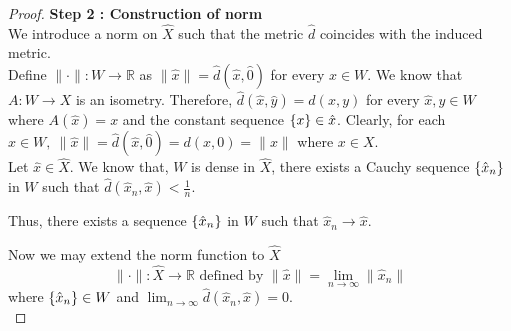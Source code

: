 \begin{proof}
	\textbf{Step 2 : Construction of norm}\\

	We introduce a norm on $\hat{X}$ such that the metric $\hat{d}$ coincides with the induced metric.\\
	
	Define $\| \cdot \| : W \to \mathbb{R}$ as $\| \hat{x} \| = \hat{d}(\hat{x},\hat{0})$ for every $\hat{x} \in W$.
	We know that $A : W \to X$ is an isometry.
	Therefore, $\hat{d}(\hat{x},\hat{y}) = d(x,y)$ for every $\hat{x},\hat{y} \in W$ where $A(\hat{x}) = x$ and the constant sequence $\left\{x\right\} \in \hat{x}$.
	Clearly, for each $\hat{x} \in W,\ \| \hat{x} \| = \hat{d}(\hat{x},\hat{0}) = d(x,0) = \| x \|$ where $x \in X$.\\

	Let $\hat{x} \in \hat{X}$. 
	We know that, $W$ is dense in $\hat{X}$, there exists a Cauchy sequence $\left\{\hat{x}_n\right\}$ in $W$ such that $\hat{d}(\hat{x}_n,\hat{x}) < \frac{1}{n}$.
	\begin{commentary}
	Thus, there exists a sequence $\left\{\hat{x}_n\right\}$ in $W$ such that $\hat{x}_n \to \hat{x}$.
	\end{commentary}
	Now we may extend the norm function to $\hat{X}$ 
	\begin{equation}
		\| \cdot \| : \hat{X} \to \mathbb{R} \text{ defined by } \| \hat{x} \| = \lim_{n \to \infty} \| \hat{x}_n \|
	\end{equation} 
	where $\left\{\hat{x}_n\right\} \in W$ and $\displaystyle \lim_{n \to \infty} \hat{d}(\hat{x}_n,\hat{x}) = 0$.\\



\end{proof}
